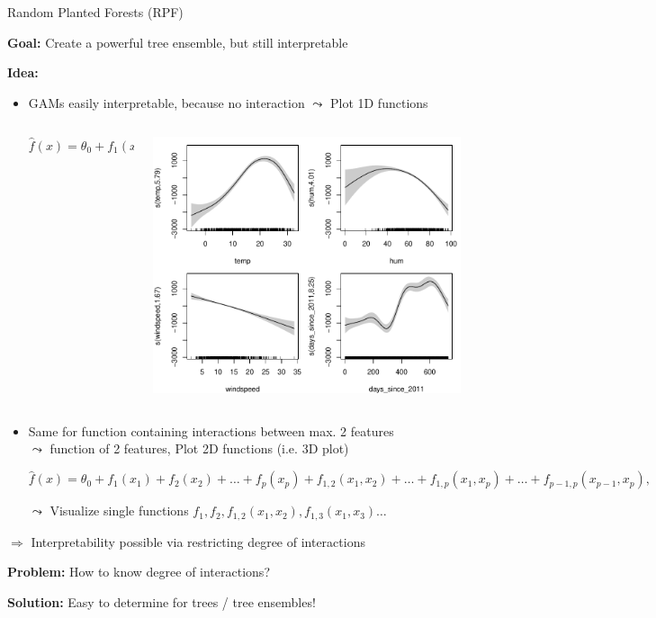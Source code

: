 \documentclass[10pt,compress,t,notes=noshow, xcolor=table]{beamer}
\begin{document}
\begin{frame}{Random Planted Forests (RPF) %
}

\textbf{Goal:} Create a powerful tree ensemble, but still interpretable

\textbf{Idea:}
\begin{itemize}
    \item GAMs easily interpretable, because no interaction $\leadsto$ Plot 1D functions
    
    \begin{columns}[T, totalwidth=\textwidth]
    \begin{column}{0.5\textwidth}
    $$
    \hat{f}(x) = \theta_0 + f_1(x_{1}) + f_2(x_{2}) + \ldots + f_p(x_{p}),
    $$
    \end{column}
    \hspace*{0.4cm}\hfill
    \centering
    \begin{column}{0.5\textwidth}
    \includegraphics[width = .4\textwidth]{figure/gam_effects.pdf}
    \end{column}
    \end{columns}
    
    \item Same for function containing interactions between max. 2 features 
    \\ $\leadsto$ function of 2 features, Plot 2D functions (i.e. 3D plot)

    $$
    \hat{f}(x) = \theta_0 + f_1(x_{1}) + f_2(x_{2}) + \ldots + f_p(x_{p}) + f_{1,2}(x_{1}, x_{2}) + \ldots + f_{1,p}(x_{1}, x_{p}) + \ldots + f_{p-1,p}(x_{p-1}, x_{p}),
    $$

    $\leadsto$ Visualize single functions $f_1, f_2, f_{1,2}(x_{1}, x_{2}), f_{1,3}(x_{1}, x_{3}) \ldots$

    
\end{itemize}

$\Rightarrow$ Interpretability possible via restricting degree of interactions

\textbf{Problem:} How to know degree of interactions?

\textbf{Solution:} Easy to determine for trees / tree ensembles!

\end{frame}
\end{document}
